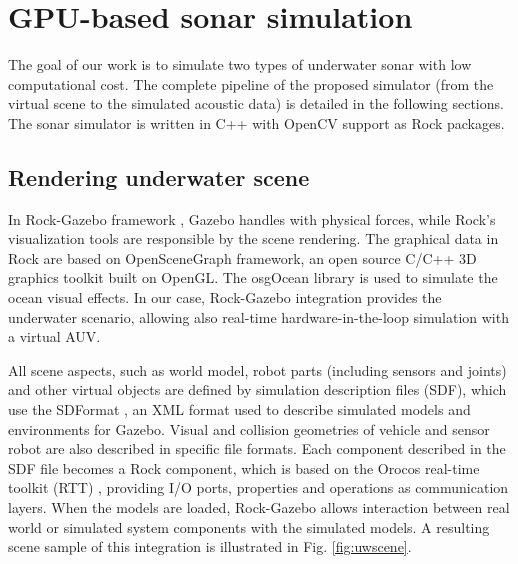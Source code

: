 \documentclass[final,5p,times]{elsarticle}
\begin{document}

\section{GPU-based sonar simulation}
\label{dev}

The goal of our work is to simulate two types of underwater sonar with low computational cost. The complete pipeline of the proposed simulator (from the virtual scene to the simulated acoustic data) is detailed in the following sections. The sonar simulator is written in C++ with OpenCV \cite{bradski2000} support as Rock packages.


\subsection{Rendering underwater scene}
\label{dev:uwscene}

In Rock-Gazebo framework \cite{watanabe2015}, Gazebo handles with physical forces, while Rock's visualization tools are responsible by the scene rendering. The graphical data in Rock are based on OpenSceneGraph framework, an open source C/C++ 3D graphics toolkit built on OpenGL. The osgOcean library is used to simulate the ocean visual effects. In our case, Rock-Gazebo integration provides the underwater scenario, allowing also real-time hardware-in-the-loop simulation with a virtual AUV.

All scene aspects, such as world model, robot parts (including sensors and
joints) and other virtual objects are defined by simulation description files (SDF), which use the SDFormat \cite{sdformat2017}, an XML format used to describe simulated models and environments for Gazebo. Visual and collision geometries of vehicle and sensor robot are also described in specific file formats. Each component described in the SDF file becomes a Rock component, which is based on the Orocos real-time toolkit (RTT) \cite{soetens2005}, providing I/O ports, properties and operations as communication layers. When the models are loaded, Rock-Gazebo allows interaction between real world or simulated system components with the simulated models. A resulting scene sample of this integration is illustrated in Fig. \ref{fig:uwscene}.

\end{document}

